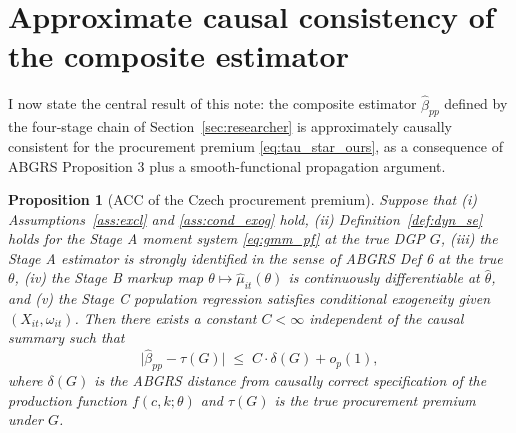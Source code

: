 \documentclass[11pt]{article}
\newtheorem{proposition}{Proposition}
\begin{document}
\section{Approximate causal consistency of the composite estimator}\label{sec:acc}

I now state the central result of this note: the composite estimator $\hat\beta_{pp}$ defined by the four-stage chain of Section~\ref{sec:researcher} is approximately causally consistent for the procurement premium \eqref{eq:tau_star_ours}, as a consequence of ABGRS Proposition 3 plus a smooth-functional propagation argument.

\begin{proposition}[ACC of the Czech procurement premium]\label{prop:main}
Suppose that (i) Assumptions~\ref{ass:excl} and \ref{ass:cond_exog} hold, (ii) Definition~\ref{def:dyn_se} holds for the Stage A moment system \eqref{eq:gmm_pf} at the true DGP $G$, (iii) the Stage A estimator is strongly identified in the sense of ABGRS Def 6 at the true $\theta$, (iv) the Stage B markup map $\theta \mapsto \hat\mu_{it}(\theta)$ is continuously differentiable at $\hat\theta$, and (v) the Stage C population regression satisfies conditional exogeneity given $(X_{it}, \omega_{it})$. Then there exists a constant $C < \infty$ independent of the causal summary such that
\begin{equation}\label{eq:acc_bound}
\bigl|\hat\beta_{pp} - \tau(G)\bigr| \;\leq\; C\cdot\delta(G) + o_p(1),
\end{equation}
where $\delta(G)$ is the ABGRS distance from causally correct specification of the production function $f(c,k;\theta)$ and $\tau(G)$ is the true procurement premium under $G$.
\end{proposition}
\end{document}

